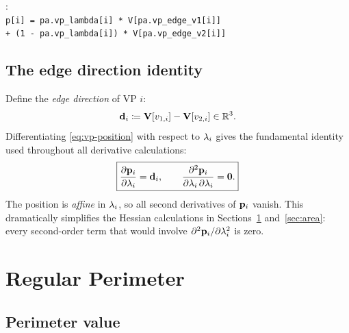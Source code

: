 \documentclass[11pt,a4paper]{article}
\begin{document}
\begin{tcolorbox}[colback=blue!4!white, colframe=blue!40!black,
                  title={Code: VP position}, fontupper=\small]
:
\\[2pt]
\texttt{p[i] = pa.vp\_lambda[i] * V[pa.vp\_edge\_v1[i]]\\
\phantom{p[i] = }+ (1 - pa.vp\_lambda[i]) * V[pa.vp\_edge\_v2[i]]}
\end{tcolorbox}

\subsection{The edge direction identity}
\label{sec:edge-direction}

Define the \emph{edge direction} of VP $i$:
\begin{equation}
  \mathbf{d}_{i} \coloneqq \mathbf{V}[v_{1,i}] - \mathbf{V}[v_{2,i}] \in \mathbb{R}^3.
  \label{eq:edge-dir}
\end{equation}
Differentiating \eqref{eq:vp-position} with respect to $\lambda_i$ gives the
fundamental identity used throughout all derivative calculations:
\begin{equation}
  \boxed{\dfrac{\partial \mathbf{p}_{i}}{\partial \lambda_i} = \mathbf{d}_{i}, \qquad
  \dfrac{\partial^2 \mathbf{p}_{i}}{\partial \lambda_i\,\partial \lambda_i} = \mathbf{0}.}
  \label{eq:vp-deriv}
\end{equation}
The position is \emph{affine} in $\lambda_i$, so all second derivatives of
$\mathbf{p}_{i}$ vanish.  This dramatically simplifies the Hessian calculations
in Sections~\ref{sec:perimeter} and~\ref{sec:area}: every second-order
term that would involve $\partial^2 \mathbf{p}_{i}/\partial\lambda_i^2$ is zero.

\section{Regular Perimeter}
\label{sec:perimeter}

\subsection{Perimeter value}
\label{sec:perimeter-value}
\end{document}
